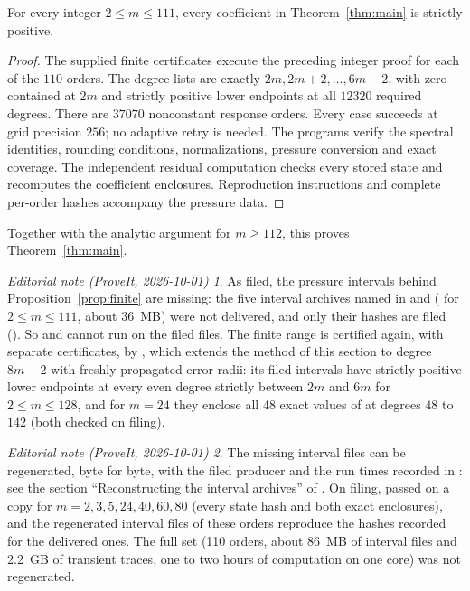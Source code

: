 \documentclass[11pt,a4paper]{article}
\theoremstyle{remark}\newtheorem*{ednote}{Editorial note (ProveIt, 2026-10-01)}
\begin{document}
\begin{proposition}\label{prop:finite}
For every integer $2\le m\le111$, every coefficient in Theorem~\ref{thm:main} is strictly positive.
\end{proposition}
\begin{proof}
The supplied finite certificates execute the preceding integer proof for each of the $110$ orders. The degree lists are exactly $2m,2m+2,\ldots,6m-2$, with zero contained at $2m$ and strictly positive lower endpoints at all $12320$ required degrees. There are $37070$ nonconstant response orders. Every case succeeds at grid precision $256$; no adaptive retry is needed. The programs verify the spectral identities, rounding conditions, normalizations, pressure conversion and exact coverage. The independent residual computation checks every stored state and recomputes the coefficient enclosures. Reproduction instructions and complete per-order hashes accompany the pressure data.
\end{proof}
Together with the analytic argument for $m\ge112$, this proves Theorem~\ref{thm:main}.
\begin{ednote}
As filed, the pressure intervals behind Proposition~\ref{prop:finite} are missing: the five
interval archives named in  and 
( for $2\le m\le111$, about 36~MB) were not delivered, and only
their hashes are filed (). So
 and  cannot run on the
filed files. The finite range is certified again, with separate certificates, by
,
which extends the method of this section to degree $8m-2$ with freshly propagated error radii:
its filed intervals have strictly positive lower endpoints at every even degree strictly between
$2m$ and $6m$ for $2\le m\le128$, and for $m=24$ they enclose all 48 exact values of
 at degrees $48$ to $142$ (both checked on filing).
\end{ednote}
\begin{ednote}
The missing interval files can be regenerated, byte for byte, with the filed producer
 and the run times recorded in
: see the section ``Reconstructing the interval
archives'' of . On filing,  passed on a copy for
$m=2,3,5,24,40,60,80$ (every state hash and both exact enclosures), and the regenerated
interval files of these orders reproduce the hashes recorded for the delivered ones. The full
set (110 orders, about 86~MB of interval files and 2.2~GB of transient traces, one to two
hours of computation on one core) was not regenerated.
\end{ednote}
\end{document}
